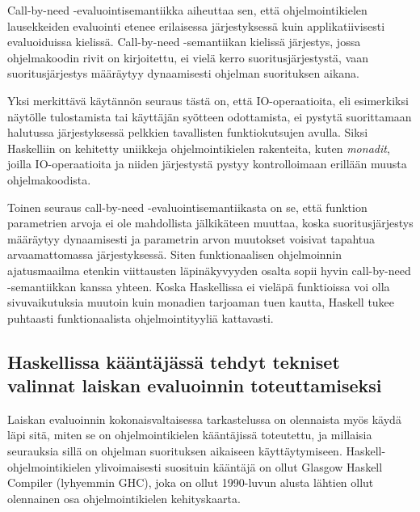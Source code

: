 Call-by-need -evaluointisemantiikka aiheuttaa sen, että ohjelmointikielen lausekkeiden evaluointi etenee erilaisessa järjestyksessä kuin applikatiivisesti evaluoiduissa kielissä. Call-by-need -semantiikan kielissä järjestys, jossa ohjelmakoodin rivit on kirjoitettu, ei vielä kerro suoritusjärjestystä, vaan suoritusjärjestys määräytyy dynaamisesti ohjelman suorituksen aikana.

Yksi merkittävä käytännön seuraus tästä on, että IO-operaatioita, eli esimerkiksi näytölle tulostamista tai käyttäjän syötteen odottamista, ei pystytä suorittamaan halutussa järjestyksessä pelkkien tavallisten funktiokutsujen avulla. Siksi Haskelliin on kehitetty uniikkeja ohjelmointikielen rakenteita, kuten \textit{monadit}, joilla IO-operaatioita ja niiden järjestystä pystyy kontrolloimaan erillään muusta ohjelmakoodista.

Toinen seuraus call-by-need -evaluointisemantiikasta on se, että funktion parametrien arvoja ei ole mahdollista jälkikäteen muuttaa, koska suoritusjärjestys määräytyy dynaamisesti ja parametrin arvon muutokset voisivat tapahtua arvaamattomassa järjestyksessä. Siten funktionaalisen ohjelmoinnin ajatusmaailma etenkin viittausten läpinäkyvyyden osalta sopii hyvin call-by-need -semantiikkan kanssa yhteen. Koska Haskellissa ei vieläpä funktioissa voi olla sivuvaikutuksia muutoin kuin monadien tarjoaman tuen kautta, Haskell tukee puhtaasti funktionaalista ohjelmointityyliä kattavasti.

\subsection{Haskellissa kääntäjässä tehdyt tekniset valinnat laiskan evaluoinnin toteuttamiseksi}

Laiskan evaluoinnin kokonaisvaltaisessa tarkastelussa on olennaista myös käydä läpi sitä, miten se on ohjelmointikielen kääntäjissä toteutettu, ja millaisia seurauksia sillä on ohjelman suorituksen aikaiseen käyttäytymiseen. Haskell-ohjelmointikielen ylivoimaisesti suosituin kääntäjä on ollut Glasgow Haskell Compiler (lyhyemmin GHC), joka on ollut 1990-luvun alusta lähtien ollut olennainen osa ohjelmointikielen kehityskaarta.


